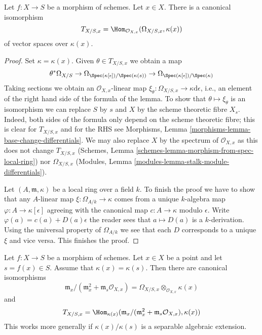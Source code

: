 \begin{lemma}
\label{lemma-tangent-space-cotangent-space}
Let $f : X \to S$ be a morphism of schemes. Let $x \in X$.
There is a canonical isomorphism
$$
T_{X/S, x} = \Hom_{\mathcal{O}_{X, x}}(\Omega_{X/S, x}, \kappa(x))
$$
of vector spaces over $\kappa(x)$.
\end{lemma}

\begin{proof}
Set $\kappa = \kappa(x)$.
Given $\theta \in T_{X/S, x}$ we obtain a map
$$
\theta^*\Omega_{X/S} \to
\Omega_{\Spec(\kappa[\epsilon])/\Spec(\kappa(s))} \to
\Omega_{\Spec(\kappa[\epsilon])/\Spec(\kappa)}
$$
Taking sections we obtain an $\mathcal{O}_{X, x}$-linear map
$\xi_\theta : \Omega_{X/S, x} \to \kappa \text{d}\epsilon$, i.e.,
an element of the right hand side of the
formula of the lemma. To show that $\theta \mapsto \xi_\theta$ is
an isomorphism we can replace $S$ by $s$ and $X$ by the
scheme theoretic fibre $X_s$. Indeed, both sides of the
formula only depend on the scheme theoretic fibre;
this is clear for $T_{X/S, x}$ and for the RHS see
Morphisms, Lemma \ref{morphisms-lemma-base-change-differentials}.
We may also replace $X$ by the spectrum of $\mathcal{O}_{X, x}$
as this does not change $T_{X/S, x}$
(Schemes, Lemma \ref{schemes-lemma-morphism-from-spec-local-ring})
nor $\Omega_{X/S, x}$
(Modules, Lemma \ref{modules-lemma-stalk-module-differentials}).

\medskip\noindent
Let $(A, \mathfrak m, \kappa)$ be a local ring over a field $k$.
To finish the proof we have to show that any $A$-linear map
$\xi : \Omega_{A/k} \to \kappa$ comes from a unique $k$-algebra
map $\varphi : A \to \kappa[\epsilon]$ agreeing with the canonical
map $c : A \to \kappa$ modulo $\epsilon$. Write
$\varphi(a) = c(a) + D(a) \epsilon$
the reader sees that $a \mapsto D(a)$ is a $k$-derivation.
Using the universal property of $\Omega_{A/k}$ we see that each
$D$ corresponds to a unique $\xi$ and vice versa. This finishes the proof.
\end{proof}

\begin{lemma}
\label{lemma-tangent-space-rational-point}
Let $f : X \to S$ be a morphism of schemes.
Let $x \in X$ be a point and let $s = f(x) \in S$.
Assume that $\kappa(x) = \kappa(s)$. Then there are canonical isomorphisms
$$
\mathfrak m_x/(\mathfrak m_x^2 + \mathfrak m_s\mathcal{O}_{X, x})
=
\Omega_{X/S, x} \otimes_{\mathcal{O}_{X, x}} \kappa(x)
$$
and
$$
T_{X/S, x} =
\Hom_{\kappa(x)}(
\mathfrak m_x/(\mathfrak m_x^2 + \mathfrak m_s\mathcal{O}_{X, x}),
\kappa(x))
$$
This works more generally if $\kappa(x)/\kappa(s)$ is a separable
algebraic extension.
\end{lemma}

